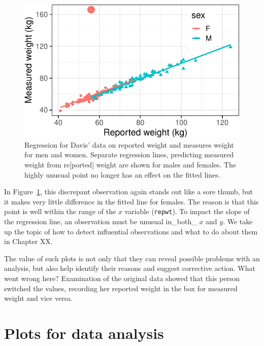 \documentclass[
  letterpaper,
  10pt,
  krantz2]{krantz}
\begin{document}
\begin{figure}[H]

{\centering \includegraphics{figs/ch02/fig-ch02-davis-reg2-1.pdf}

}

\caption{\label{fig-ch02-davis-reg2}Regression for Davis' data on
reported weight and measures weight for men and women. Separate
regression lines, predicting measured weight from re{[}ported{]} weight
are shown for males and females. The highly unusual point no longer has
an effect on the fitted lines.}

\end{figure}

In Figure~\ref{fig-ch02-davis-reg2}, this discrepant observation again
stands out like a sore thumb, but it makes very little difference in the
fitted line for females. The reason is that this point is well within
the range of the \(x\) variable (\texttt{repwt}). To impact the slope of
the regression line, an observation must be unusual in\_both\_ \(x\) and
\(y\). We take up the topic of how to detect influential observations
and what to do about them in Chapter XX.

The value of such plots is not only that they can reveal possible
problems with an analysis, but also help identify their reasons and
suggest corrective action. What went wrong here? Examination of the
original data showed that this person switched the values, recording her
reported weight in the box for measured weight and vice versa.

\hypertarget{plots-for-data-analysis}{%
\section*{Plots for data analysis}\label{plots-for-data-analysis}}
\end{document}
